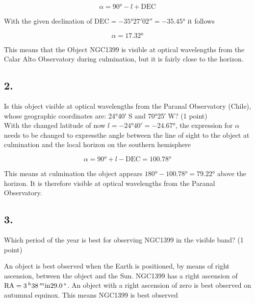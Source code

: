 \documentclass[11pt,a4paper,twoside]{article}
\begin{document}
\begin{equation}
 \alpha = \ang{90} - l + \text{DEC}
\end{equation}

With the given declination of $\text{DEC} = \ang{-35;27;02} = \ang{-35.45}$ it follows 

\begin{equation}
 \alpha = \ang{17.32}
\end{equation}

This means that the Object NGC1399 is visible at optical wavelengths from the Calar Alto Observatory during culmination, but it is fairly close to the horizon. \\

\subsection*{2.}  Is this object visible at optical wavelengths from the Paranal Observatory (Chile), whose geographic coordinates are: \ang{24;40;} S and \ang{70;25;} W? (1 point) \\

With the changed latitude of now $l = -\ang{24;40;} = -\ang{24.67}$, the expression for $\alpha$ needs to be changed to expressthe angle between the line of sight to the object at culmination and the local horizon on the southern hemisphere

\begin{equation}
 \alpha = \ang{90} + l - \text{DEC} = \ang{100.78}
\end{equation}

This means at culmination the object appears $\ang{180} - \ang{100.78} = \ang{79.22}$ above the horizon. It is therefore visible at optical wavelengths from the Paranal Observatory. \\

\subsection*{3.} Which period of the year is best for observing NGC1399 in the visible band? (1 point)

An object is best observed when the Earth is positioned, by means of right ascension, between the object and the Sun. NGC1399 has a right ascension of $\text{RA} = \SI{03}{^\hour} \SI{38}{^\minute} \SI{29.0}{^\second}$. An object with a right ascension of zero is best observed on autumnal equinox. This means NGC1399 is best observed 
\end{document}
